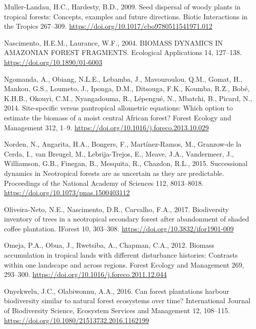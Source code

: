 \documentclass[
  12pt,
]{article}
\newlength{\cslhangindent}
\newlength{\cslentryspacingunit} %
\newenvironment{CSLReferences}[2] %
 {%
  \setlength{\parindent}{0pt}
  \ifodd #1
  \let\oldpar\par
  \def\par{\hangindent=\cslhangindent\oldpar}
  \fi
  \setlength{\parskip}{#2\cslentryspacingunit}
 }%
 {}
\begin{document}
\begin{CSLReferences}{1}{0}
\leavevmode{}%
Muller-Landau, H.C., Hardesty, B.D., 2009. Seed dispersal of woody plants in tropical forests: Concepts, examples and future directions. Biotic Interactions in the Tropics 267--309. \url{https://doi.org/10.1017/cbo9780511541971.012}

\leavevmode{}%
Nascimento, H.E.M., Laurance, W.F., 2004. {BIOMASS DYNAMICS IN AMAZONIAN FOREST FRAGMENTS}. Ecological Applications 14, 127--138. \url{https://doi.org/10.1890/01-6003}

\leavevmode{}%
Ngomanda, A., Obiang, N.L.E., Lebamba, J., Mavouroulou, Q.M., Gomat, H., Mankou, G.S., Loumeto, J., Iponga, D.M., Ditsouga, F.K., Koumba, R.Z., Bobé, K.H.B., Okouyi, C.M., Nyangadouma, R., Lépengué, N., Mbatchi, B., Picard, N., 2014. Site-specific versus pantropical allometric equations: {Which} option to estimate the biomass of a moist central {African} forest? Forest Ecology and Management 312, 1--9. \url{https://doi.org/10.1016/j.foreco.2013.10.029}

\leavevmode{}%
Norden, N., Angarita, H.A., Bongers, F., Martínez-Ramos, M., Granzow-de la Cerda, I., van Breugel, M., Lebrija-Trejos, E., Meave, J.A., Vandermeer, J., Williamson, G.B., Finegan, B., Mesquita, R., Chazdon, R.L., 2015. Successional dynamics in {Neotropical} forests are as uncertain as they are predictable. Proceedings of the National Academy of Sciences 112, 8013--8018. \url{https://doi.org/10.1073/pnas.1500403112}

\leavevmode{}%
Oliveira-Neto, N.E., Nascimento, D.R., Carvalho, F.A., 2017. Biodiversity inventory of trees in a neotropical secondary forest after abandonment of shaded coffee plantation. IForest 10, 303--308. \url{https://doi.org/10.3832/ifor1901-009}

\leavevmode{}%
Omeja, P.A., Obua, J., Rwetsiba, A., Chapman, C.A., 2012. Biomass accumulation in tropical lands with different disturbance histories: {Contrasts} within one landscape and across regions. Forest Ecology and Management 269, 293--300. \url{https://doi.org/10.1016/j.foreco.2011.12.044}

\leavevmode{}%
Onyekwelu, J.C., Olabiwonnu, A.A., 2016. Can forest plantations harbour biodiversity similar to natural forest ecosystems over time? International Journal of Biodiversity Science, Ecosystem Services and Management 12, 108--115. \url{https://doi.org/10.1080/21513732.2016.1162199}


\end{CSLReferences}
\end{document}
